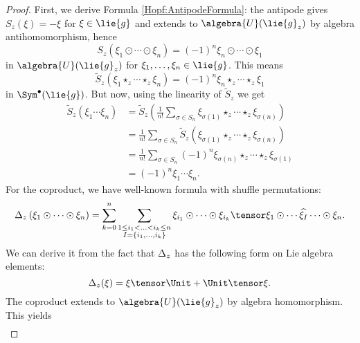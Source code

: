 \begin{proof}
	First, we derive Formula \ref{Hopf:AntipodeFormula}: the antipode gives
	$S_z(\xi) = - \xi$ for $\xi \in \lie{g}$ and extends to $\algebra{U}
	(\lie{g}_z)$ by algebra antihomomorphism, hence
	\begin{equation*}
		S_z \left( 
			\xi_1 \odot \cdots \odot \xi_n
		\right)
		=
		(-1)^n
		\xi_n \odot \cdots \odot \xi_1
	\end{equation*}
	in $\algebra{U}(\lie{g}_z)$ for $\xi_1, \ldots, \xi_n \in \lie{g}$.
	This means
	\begin{equation*}
		\widetilde{S}_z \left( 
			\xi_1 \star_z \cdots \star_z \xi_n
		\right)
		=
		(-1)^n
		\xi_n \star_z \cdots \star_z \xi_1
	\end{equation*}	
	in $\Sym^{\bullet}(\lie{g})$. But now, using the linearity of 
	$\widetilde{S}_z$ we get
	\begin{align*}
		\widetilde{S}_z \left( \xi_1 \cdots \xi_n \right)
		& =
		\widetilde{S}_z \left( 
		\frac{1}{n!}
			\sum\limits_{\sigma \in S_n}
			\xi_{\sigma(1)} 
			\star_z \cdots \star_z 
			\xi_{\sigma(n)}
		\right)
		\\
		& =
		\frac{1}{n!}
		\sum\limits_{\sigma \in S_n}
		\widetilde{S}_z \left( 
			\xi_{\sigma(1)} 
			\star_z \cdots \star_z 
			\xi_{\sigma(n)}
		\right)
		\\
		& =
		\frac{1}{n!}
		\sum\limits_{\sigma \in S_n}
		(-1)^n
		\xi_{\sigma(n)} 
		\star_z \cdots \star_z 
		\xi_{\sigma(1)}
		\\
		& =
		(-1)^n
		\xi_1 \cdots \xi_n.
	\end{align*}
	For the coproduct, we have well-known formula with shuffle permutations:
	\begin{equation*}
		\ocoproduct_z \left(
			\xi_1 \odot \cdots \odot \xi_n
		\right)
		=
		\sum\limits_{k=0}^n
		\sum\limits_{\substack{
			1 \leq i_1
			< \ldots <
			i_k \leq n
			\\
			I = \{i_1, \ldots, i_k\}
		}}
		\xi_{i_1} \odot \cdots \odot \xi_{i_k}
		\tensor
		\xi_1 
		\odot \cdots 
		\widehat{\xi_I}
		\cdots \odot
		\xi_n.
	\end{equation*}
	We can derive it from the fact that $\Delta_z$ has the following form on 
	Lie algebra elements:
	\begin{equation*}
		\ocoproduct_z (\xi)
		=
		\xi \tensor \Unit
		+
		\Unit \tensor \xi.
	\end{equation*}
	The coproduct extends to $\algebra{U}(\lie{g}_z)$ by algebra 
	homomorphism. This yields
	\begin{align*}

\end{align*}
\end{proof}
